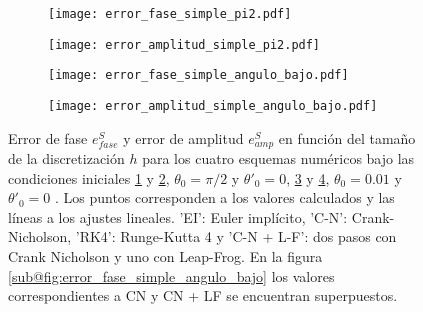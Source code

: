 \documentclass[aps,prb,twocolumn,superscriptaddress,floatfix,longbibliography,10pt]{revtex4-2}
\newcounter{para}
\begin{document}

\onecolumngrid


\begin{figure}
  \centering
  \begin{subfigure}[b]{0.45\textwidth}
      \centering
      \texttt{[image: error\_fase\_simple\_pi2.pdf]}
      \caption{\label{fig:error_fase_simple_pi2}}
  \end{subfigure}
  \hfill
  \begin{subfigure}[b]{0.45\textwidth}
      \centering
      \texttt{[image: error\_amplitud\_simple\_pi2.pdf]}
      \caption{\label{fig:error_amplitud_simple_pi2}}
  \end{subfigure}
  \hfill
  \begin{subfigure}[b]{0.45\textwidth}
      \centering
      \texttt{[image: error\_fase\_simple\_angulo\_bajo.pdf]}
      \caption{\label{fig:error_fase_simple_angulo_bajo}}
  \end{subfigure}
  \hfill
  \begin{subfigure}[b]{0.45\textwidth}
      \centering
      \texttt{[image: error\_amplitud\_simple\_angulo\_bajo.pdf]}
      \caption{\label{fig:error_amplitud_simple_angulo_bajo}}
  \end{subfigure}
     \caption{Error de fase $e^S_{fase}$ y error de amplitud $e^S_{amp}$ en función del tamaño de la discretización $h$ para los cuatro esquemas numéricos bajo las condiciones iniciales \ref{fig:error_fase_simple_pi2} y \ref{fig:error_amplitud_simple_pi2}, $\theta_0 = \pi/2$ y $\theta'_0 = 0$, \ref{fig:error_fase_simple_angulo_bajo} y \ref{fig:error_amplitud_simple_angulo_bajo}, $\theta_0 = 0.01$ y $\theta'_0 = 0$ . Los puntos corresponden a los valores calculados y las líneas a los ajustes lineales. 'EI': Euler implícito, 'C-N': Crank-Nicholson, 'RK4': Runge-Kutta 4 y 'C-N + L-F': dos pasos con Crank Nicholson y uno con Leap-Frog. En la figura \ref{sub@fig:error_fase_simple_angulo_bajo} los valores correspondientes a CN y CN + LF se encuentran superpuestos.}
     \label{fig:simple_error_vs_h}
\end{figure}
\end{document}
